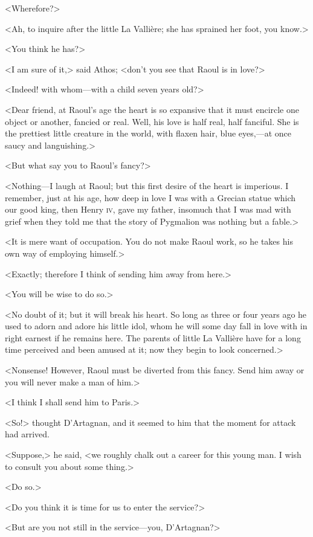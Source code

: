 <Wherefore?>

<Ah, to inquire after the little La Vallière; she has sprained her foot, you know.>

<You think he has?>

<I am sure of it,> said Athos; <don't you see that Raoul is in love?>

<Indeed! with whom—with a child seven years old?>

<Dear friend, at Raoul's age the heart is so expansive that it must encircle one object or another, fancied or real. Well, his love is half real, half fanciful. She is the prettiest little creature in the world, with flaxen hair, blue eyes,—at once saucy and languishing.>

<But what say you to Raoul's fancy?>

<Nothing—I laugh at Raoul; but this first desire of the heart is imperious. I remember, just at his age, how deep in love I was with a Grecian statue which our good king, then Henry \textsc{iv}, gave my father, insomuch that I was mad with grief when they told me that the story of Pygmalion was nothing but a fable.>

<It is mere want of occupation. You do not make Raoul work, so he takes his own way of employing himself.>

<Exactly; therefore I think of sending him away from here.>

<You will be wise to do so.>

<No doubt of it; but it will break his heart. So long as three or four years ago he used to adorn and adore his little idol, whom he will some day fall in love with in right earnest if he remains here. The parents of little La Vallière have for a long time perceived and been amused at it; now they begin to look concerned.>

<Nonsense! However, Raoul must be diverted from this fancy. Send him away or you will never make a man of him.>

<I think I shall send him to Paris.>

<So!> thought D'Artagnan, and it seemed to him that the moment for attack had arrived.

<Suppose,> he said, <we roughly chalk out a career for this young man. I wish to consult you about some thing.>

<Do so.>

<Do you think it is time for us to enter the service?>

<But are you not still in the service—you, D'Artagnan?>

